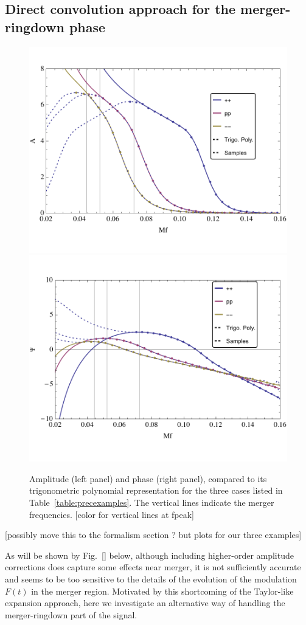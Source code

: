 \documentclass[aps,showpacs,twocolumn,
prd,superscriptaddress,nofootinbib]{revtex4-1}
\newcommand{\SM}[1]{{\color{Red} #1}}
\begin{document}

\subsection{Direct convolution approach for the merger-ringdown phase}
\label{subsec:trigopoly}

\begin{figure}
  \centering
  \includegraphics[width=.48\linewidth]{plots/trig_amp.pdf}
  \hspace{0.2cm}
  \includegraphics[width=.48\linewidth]{plots/trig_phase.pdf}
  \caption{Amplitude (left panel) and phase (right panel), compared to its trigonometric polynomial representation for the three cases listed in Table~\ref{table:precexamples}. The vertical lines indicate the merger frequencies. \SM{[color for vertical lines at fpeak]}}
  \label{fig:trigopoly}
\end{figure}

\SM{[possibly move this to the formalism section ? but plots for our three examples]}

As will be shown by Fig.~\ref{} below, although including higher-order amplitude corrections does capture some effects near merger, it is not sufficiently accurate and seems to be too sensitive to the details of the evolution of the modulation $F(t)$ in the merger region. Motivated by this shortcoming of the Taylor-like expansion approach, here we investigate an alternative way of handling the merger-ringdown part of the signal.
\end{document}
